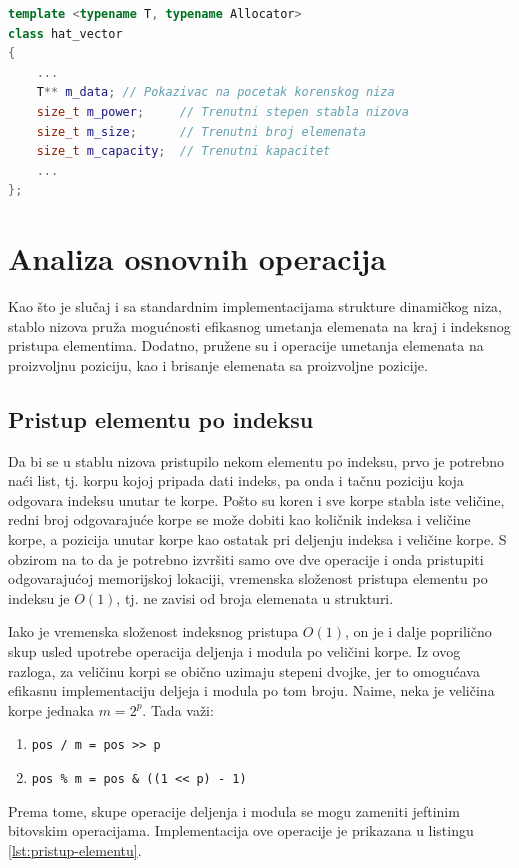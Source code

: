 \documentclass[a4paper]{article}
\begin{document}
\begin{lstlisting}[language=C++, caption={Osnovna struktura stabla nizova}, captionpos=b, label={lst:osnovna-struktura}]
template <typename T, typename Allocator>
class hat_vector
{
    ...
    T** m_data; // Pokazivac na pocetak korenskog niza
    size_t m_power;     // Trenutni stepen stabla nizova
    size_t m_size;      // Trenutni broj elemenata
    size_t m_capacity;  // Trenutni kapacitet
    ...
};
\end{lstlisting}

\section{Analiza osnovnih operacija}

Kao što je slučaj i sa standardnim implementacijama strukture dinamičkog niza, stablo nizova pruža mogućnosti efikasnog umetanja elemenata na kraj i indeksnog pristupa elementima. Dodatno, pružene su i operacije umetanja elemenata na proizvoljnu poziciju, kao i brisanje elemenata sa proizvoljne pozicije.

\subsection{Pristup elementu po indeksu}

Da bi se u stablu nizova pristupilo nekom elementu po indeksu, prvo je potrebno naći list, tj. korpu kojoj pripada dati indeks, pa onda i tačnu poziciju koja odgovara indeksu unutar te korpe. Pošto su koren i sve korpe stabla iste veličine, redni broj odgovarajuće korpe se može dobiti kao količnik indeksa i veličine korpe, a pozicija unutar korpe kao ostatak pri deljenju indeksa i veličine korpe. S obzirom na to da je potrebno izvršiti samo ove dve operacije i onda pristupiti odgovarajućoj memorijskoj lokaciji, vremenska složenost pristupa elementu po indeksu je $O(1)$, tj. ne zavisi od broja elemenata u strukturi.

Iako je vremenska složenost indeksnog pristupa $O(1)$, on je i dalje poprilično skup usled upotrebe operacija deljenja i modula po veličini korpe. Iz ovog razloga, za veličinu korpi se obično uzimaju stepeni dvojke, jer to omogućava efikasnu implementaciju deljeja i modula po tom broju. Naime, neka je veličina korpe jednaka $m = 2^p$. Tada važi:
\begin{enumerate}
    \item \verb|pos / m = pos >> p|
    \item \verb|pos % m = pos & ((1 << p) - 1)|
\end{enumerate}
Prema tome, skupe operacije deljenja i modula se mogu zameniti jeftinim bitovskim operacijama. Implementacija ove operacije je prikazana u listingu \ref{lst:pristup-elementu}.
\end{document}

